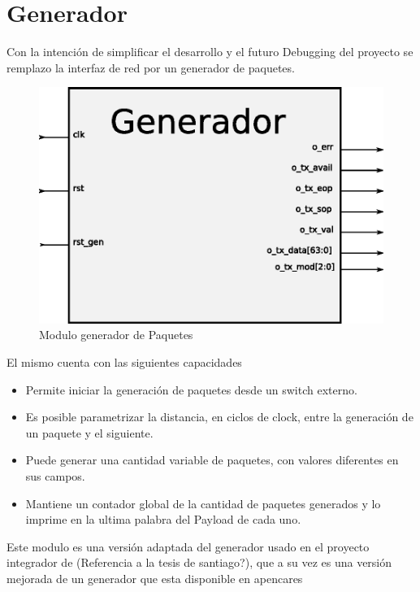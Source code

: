 \section{Generador}

Con la intención de simplificar el desarrollo y el futuro Debugging del proyecto se remplazo la interfaz de red por un generador de paquetes.

\begin{figure}[H]
  \centering
	\includegraphics[scale=0.60]{3-arquitectura/graf/bloqgenerador.eps}
  \caption{Modulo generador de Paquetes}
  \label{fig:gen}
\end{figure}


El mismo cuenta con las siguientes capacidades

\begin{itemize}
	\item Permite iniciar la generación de paquetes desde un switch externo.
	\item Es posible parametrizar la distancia, en ciclos de clock, entre la generación de un paquete y el siguiente.
	\item Puede generar una cantidad variable de paquetes, con valores diferentes en sus campos.
	\item Mantiene un contador global de la cantidad de paquetes generados y lo imprime en la ultima palabra del Payload de cada uno.
\end{itemize}

Este modulo es una versión adaptada del generador usado en el proyecto integrador de (Referencia a la tesis de santiago?), que a su vez es una versión mejorada de un generador que esta disponible en apencares


